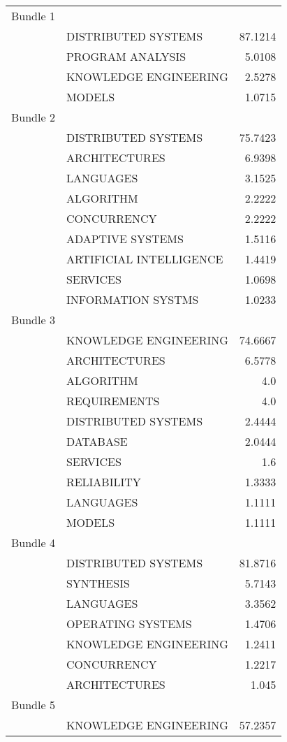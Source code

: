 \begin{center}
\begin{longtable}{|llr|}
    \hline
    Bundle 1 & ~ & ~ \\
 ~ & DISTRIBUTED SYSTEMS & 87.1214 \\
 ~ & PROGRAM ANALYSIS & 5.0108 \\
 ~ & KNOWLEDGE ENGINEERING & 2.5278 \\
 ~ & MODELS & 1.0715 \\
Bundle 2 & ~ & ~ \\
 ~ & DISTRIBUTED SYSTEMS & 75.7423 \\
 ~ & ARCHITECTURES & 6.9398 \\
 ~ & LANGUAGES & 3.1525 \\
 ~ & ALGORITHM & 2.2222 \\
 ~ & CONCURRENCY & 2.2222 \\
 ~ & ADAPTIVE SYSTEMS & 1.5116 \\
 ~ & ARTIFICIAL INTELLIGENCE & 1.4419 \\
 ~ & SERVICES & 1.0698 \\
 ~ & INFORMATION SYSTMS & 1.0233 \\
Bundle 3 & ~ & ~ \\
 ~ & KNOWLEDGE ENGINEERING & 74.6667 \\
 ~ & ARCHITECTURES & 6.5778 \\
 ~ & ALGORITHM & 4.0 \\
 ~ & REQUIREMENTS & 4.0 \\
 ~ & DISTRIBUTED SYSTEMS & 2.4444 \\
 ~ & DATABASE & 2.0444 \\
 ~ & SERVICES & 1.6 \\
 ~ & RELIABILITY & 1.3333 \\
 ~ & LANGUAGES & 1.1111 \\
 ~ & MODELS & 1.1111 \\
Bundle 4 & ~ & ~ \\
 ~ & DISTRIBUTED SYSTEMS & 81.8716 \\
 ~ & SYNTHESIS & 5.7143 \\
 ~ & LANGUAGES & 3.3562 \\
 ~ & OPERATING SYSTEMS & 1.4706 \\
 ~ & KNOWLEDGE ENGINEERING & 1.2411 \\
 ~ & CONCURRENCY & 1.2217 \\
 ~ & ARCHITECTURES & 1.045 \\
Bundle 5 & ~ & ~ \\
 ~ & KNOWLEDGE ENGINEERING & 57.2357 \\

\end{longtable}
\end{center}
